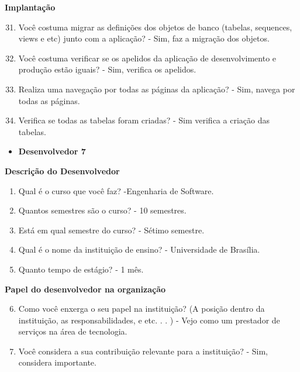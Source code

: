 \begin{apendicesenv}
\textbf{Implantação}

\begin{enumerate}
	\setcounter{enumi}{30}
	\item Você costuma migrar as definições dos objetos de banco (tabelas, sequences, views e
	etc) junto com a aplicação?\newline
	- Sim, faz a migração dos objetos.
	\item Você costuma verificar se os apelidos da aplicação de desenvolvimento e produção
	estão iguais?\newline
	- Sim, verifica os apelidos.
	\item Realiza uma navegação por todas as páginas da aplicação?\newline
	- Sim, navega por todas as páginas.
	\item Verifica se todas as tabelas foram criadas?\newline
	- Sim verifica a criação das tabelas.
\end{enumerate}



\begin{itemize}
	\item \textbf{Desenvolvedor 7}
\end{itemize}

\textbf{Descrição do Desenvolvedor}

\begin{enumerate}
	\item Qual é o curso que você faz?\newline
	-Engenharia de Software.
	\item Quantos semestres são o curso?\newline
	- 10 semestres.
	\item Está em qual semestre do curso?\newline
	- Sétimo semestre.
	\item Qual é o nome da instituição de ensino?\newline
	- Universidade de Brasília.
	\item Quanto tempo de estágio?\newline
	- 1 mês.
\end{enumerate}

\textbf{Papel do desenvolvedor na organização}

\begin{enumerate}
	\setcounter{enumi}{5}
	\item Como você enxerga o seu papel na instituição? (A posição dentro da instituição, as
	responsabilidades, e etc. . . )\newline
	- Vejo como um prestador de serviços na área de tecnologia.
	\item Você considera a sua contribuição relevante para a instituição?\newline
	- Sim, considera importante.
\end{enumerate}


\end{apendicesenv}
